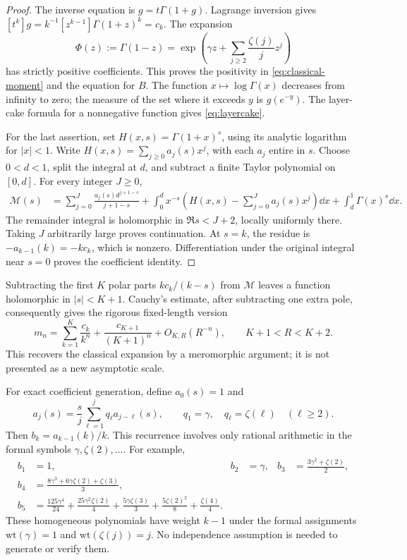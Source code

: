 \begin{proof}
The inverse equation is \(g=t\Gamma(1+g)\). Lagrange inversion gives
\([t^k]g=k^{-1}[z^{k-1}]\Gamma(1+z)^k=c_k\).
The expansion
\begin{equation}\label{eq:phi}
 \Phi(z):=\Gamma(1-z)
 =\exp\left(\gamma z+\sum_{j\geq2}\frac{\zeta(j)}jz^j\right)
\end{equation}
has strictly positive coefficients. This proves the positivity in
\eqref{eq:classical-moment} and the equation for \(B\).
The function \(x\mapsto\log\Gamma(x)\) decreases from infinity to zero;
the measure of the set where it exceeds \(y\) is \(g(e^{-y})\).
The layer-cake formula for a nonnegative function gives
\eqref{eq:layercake}.

For the last assertion, set \(H(x,s)=\Gamma(1+x)^s\), using its analytic
logarithm for \(|x|<1\). Write
\(H(x,s)=\sum_{j\geq0}a_j(s)x^j\), with each \(a_j\) entire in \(s\).
Choose \(0<d<1\), split the integral at \(d\), and subtract a finite
Taylor polynomial on \([0,d]\). For every integer \(J\geq0\),
\begin{align}
 \mathcal M(s)
 &=\sum_{j=0}^J\frac{a_j(s)d^{j+1-s}}{j+1-s}
   +\int_0^d x^{-s}\left(H(x,s)-\sum_{j=0}^Ja_j(s)x^j\right)\dd x
   +\int_d^1\Gamma(x)^s\dd x. \label{eq:meromorphic}
\end{align}
The remainder integral is holomorphic in \(\Re s<J+2\), locally
uniformly there. Taking \(J\) arbitrarily large proves continuation.
At \(s=k\), the residue is \(-a_{k-1}(k)=-k c_k\), which is nonzero.
Differentiation under the original integral near \(s=0\) proves the
coefficient identity.
\end{proof}

Subtracting the first \(K\) polar parts \(k c_k/(k-s)\) from
\(\mathcal M\) leaves a function holomorphic in \(|s|<K+1\).
Cauchy's estimate, after subtracting one extra pole, consequently gives
the rigorous fixed-length version
\begin{equation}\label{eq:fixed-remainder}
 m_n=\sum_{k=1}^K\frac{c_k}{k^n}
       +\frac{c_{K+1}}{(K+1)^n}
       +O_{K,R}(R^{-n}),\qquad K+1<R<K+2.
\end{equation}
This recovers the classical expansion by a meromorphic argument; it is
not presented as a new asymptotic scale.

For exact coefficient generation, define \(a_0(s)=1\) and
\[
 a_j(s)=\frac{s}{j}\sum_{\ell=1}^j q_\ell a_{j-\ell}(s),\qquad
 q_1=\gamma,\quad q_\ell=\zeta(\ell)\quad(\ell\geq2).
\]
Then \(b_k=a_{k-1}(k)/k\). This recurrence involves only rational
arithmetic in the formal symbols \(\gamma,\zeta(2),\ldots\).
For example,
\begin{align*}
 b_1&=1,& b_2&=\gamma,&
 b_3&=\frac{3\gamma^2+\zeta(2)}2,\\
 b_4&=\frac{8\gamma^3+6\gamma\zeta(2)+\zeta(3)}3,\\
 b_5&=\frac{125\gamma^4}{24}
      +\frac{25\gamma^2\zeta(2)}4+\frac{5\gamma\zeta(3)}3
      +\frac{5\zeta(2)^2}{8}+\frac{\zeta(4)}4.
\end{align*}
These homogeneous polynomials have weight \(k-1\) under the formal
assignments \(\mathrm{wt}(\gamma)=1\) and
\(\mathrm{wt}(\zeta(j))=j\). No independence assumption is needed to
generate or verify them.

